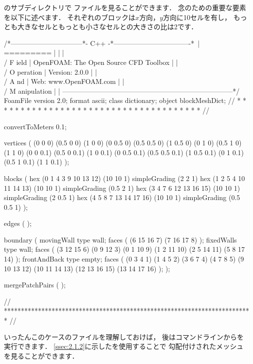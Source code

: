 のサブディレクトリで
ファイルを見ることができます．
念のための重要な要素を以下に述べます．
それぞれのブロックは$x$方向，$y$方向に10セルを有し，
もっとも大きなセルともっとも小さなセルとの大きさの比は2です．
\begin{OFverbatim}[file, linenum=17]
/*--------------------------------*- C++ -*----------------------------------*\
| =========                 |                                                 |
| \\      /  F ield         | OpenFOAM: The Open Source CFD Toolbox           |
|  \\    /   O peration     | Version:  2.0.0                                 |
|   \\  /    A nd           | Web:      www.OpenFOAM.com                      |
|    \\/     M anipulation  |                                                 |
\*---------------------------------------------------------------------------*/
FoamFile
{
    version     2.0;
    format      ascii;
    class       dictionary;
    object      blockMeshDict;
}
// * * * * * * * * * * * * * * * * * * * * * * * * * * * * * * * * * * * * * //

convertToMeters 0.1;

vertices        
(
    (0 0 0)
    (0.5 0 0)
    (1 0 0)
    (0 0.5 0)
    (0.5 0.5 0)
    (1 0.5 0)
    (0 1 0)
    (0.5 1 0)
    (1 1 0)
    (0 0 0.1)
    (0.5 0 0.1)
    (1 0 0.1)
    (0 0.5 0.1)
    (0.5 0.5 0.1)
    (1 0.5 0.1)
    (0 1 0.1)
    (0.5 1 0.1)
    (1 1 0.1)
);

blocks          
(
    hex (0 1 4 3 9 10 13 12) (10 10 1) simpleGrading (2 2 1)
    hex (1 2 5 4 10 11 14 13) (10 10 1) simpleGrading (0.5 2 1)
    hex (3 4 7 6 12 13 16 15) (10 10 1) simpleGrading (2 0.5 1)
    hex (4 5 8 7 13 14 17 16) (10 10 1) simpleGrading (0.5 0.5 1)
);

edges           
(
);

boundary
(
    movingWall
    {
        type wall;
        faces
        (
            (6 15 16 7)
            (7 16 17 8)
        );
    }
    fixedWalls
    {
        type wall;
        faces
        (
            (3 12 15 6)
            (0 9 12 3)
            (0 1 10 9)
            (1 2 11 10)
            (2 5 14 11)
            (5 8 17 14)
        );
    }
    frontAndBack
    {
        type empty;
        faces
        (
            (0 3 4 1)
            (1 4 5 2)
            (3 6 7 4)
            (4 7 8 5)
            (9 10 13 12)
            (10 11 14 13)
            (12 13 16 15)
            (13 14 17 16)
        );
    }
);

mergePatchPairs
(
);

// ************************************************************************* //
\end{OFverbatim}
いったんこのケースのファイルを理解しておけば，
後はコマンドラインからを実行できます．
\autoref{ssec:2.1.2}に示したを使用することで
勾配付けされたメッシュを見ることができます．

